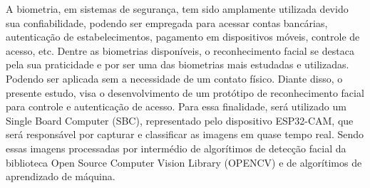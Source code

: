 
\begin{resumoutfpr}%

A biometria, em sistemas de segurança, tem sido amplamente utilizada devido sua 
confiabilidade, podendo ser empregada para acessar contas bancárias, autenticação de 
estabelecimentos, pagamento em dispositivos móveis, controle de acesso, etc. 
Dentre as biometrias disponíveis, o reconhecimento facial se destaca pela sua 
praticidade e por ser uma das biometrias mais estudadas e utilizadas. 
Podendo ser aplicada sem a necessidade de um contato físico. Diante disso, 
o presente estudo, visa o desenvolvimento de um protótipo de 
reconhecimento facial para controle e autenticação de acesso. Para essa finalidade, 
será utilizado um Single Board Computer (SBC), representado pelo dispositivo 
ESP32-CAM, que será responsável por capturar e classificar as imagens em quase tempo 
real. Sendo essas imagens processadas por intermédio de algorítimos de detecção facial 
da biblioteca Open Source Computer Vision Library (OPENCV) e de algorítimos 
de aprendizado de máquina.
\end{resumoutfpr}
